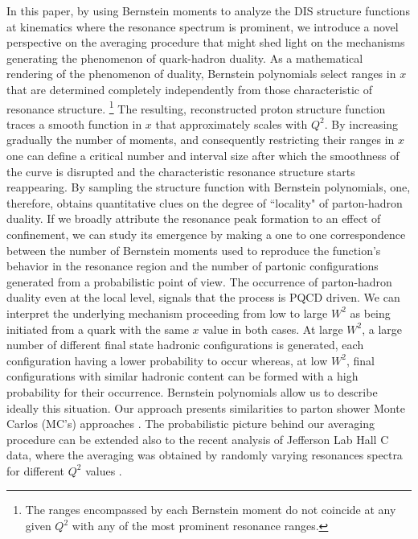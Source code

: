 \documentclass[
twocolumn,
aps,prd,
nofootinbib,
superscriptaddress,
showpacs,ligh
tightenlines, 
]{revtex4}
\begin{document}
In this paper, by using Bernstein moments to analyze the DIS structure functions at kinematics where the resonance spectrum is prominent, we introduce a novel perspective on the averaging procedure that might shed light on the mechanisms generating the phenomenon of quark-hadron duality. As a mathematical rendering of the phenomenon of duality, Bernstein polynomials select ranges in $x$ that are determined completely independently from those characteristic of resonance structure.
\footnote{The ranges encompassed by each Bernstein moment do not coincide at any given $Q^2$ with any of the most prominent resonance ranges.}
The resulting, reconstructed proton structure function traces a smooth function in $x$ that approximately scales with $Q^2$.
By increasing gradually the number of moments, and consequently restricting their ranges in $x$ one can define a critical number and interval size after which the smoothness of the curve is disrupted and the characteristic resonance structure starts reappearing. 
By sampling the structure function with Bernstein polynomials, one, therefore, obtains quantitative clues on the degree of ``locality" of parton-hadron duality. 
If we broadly attribute the resonance peak formation to an effect of confinement, 
we can study its emergence by making a one to one correspondence between the number of Bernstein moments used to reproduce the function's behavior in the resonance region and the number of partonic configurations generated from a probabilistic point of view. 
The occurrence of parton-hadron duality even at the local level, signals that the process is PQCD driven.  We can interpret the underlying mechanism proceeding from low to large $W^2$ as being initiated from a quark with the same $x$ value in both cases. At large $W^2$, a large number of different final state hadronic configurations is generated, each configuration having a lower probability to occur whereas, at low $W^2$, final configurations with similar hadronic content can be formed with a high probability for their occurrence.  
Bernstein polynomials allow us to describe ideally this situation.
Our approach presents similarities to parton shower Monte Carlos (MC’s) approaches \cite{Lai:2009ne,Frixione:2002ik}. The probabilistic picture behind our averaging procedure can be extended also to the recent analysis of Jefferson Lab Hall C data, where the averaging was obtained by randomly varying resonances spectra for different $Q^2$ values \cite{Christy}.   
\end{document}
